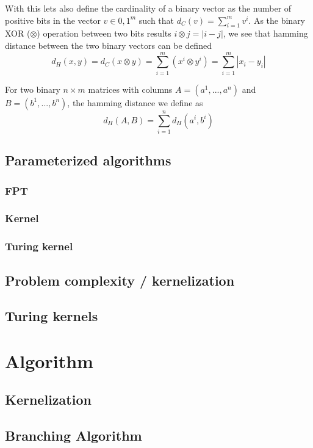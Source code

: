 \documentclass[a4paper]{article}
\begin{document}
With this lets also define the cardinality of a binary vector as the number of positive bits in 
the vector $v \in {0,1}^m$ such that $d_C(v)=\sum_{i = 1}^{m} v^i$. As the binary XOR ($\otimes$) 
operation between two bits results $i \otimes j = |i - j|$, we see that hamming distance between 
the two binary vectors can be defined
\[
    d_H(x, y) = d_C(x \otimes y) =\sum_{i = 1}^{m} (x^i \otimes y^i) = \sum_{i = 1}^{m} |x_i - y_i|
\]


For two binary $n \times m$ matrices with columns $A=(a^1,...,a^n)$ and 
$B=(b^1,...,b^n)$, the hamming distance we define as
\[
    d_H(A,B) = \sum_{i = 1}^{n} d_H(a^i, b^i)    
\]

\subsection{Parameterized algorithms}
\subsubsection{FPT}
\subsubsection{Kernel}
\subsubsection{Turing kernel}

\subsection{Problem complexity / kernelization}
\subsection{Turing kernels}

%
%
\newpage

\section{Algorithm}
\subsection{Kernelization}


\subsection{Branching Algorithm}

\end{document}
